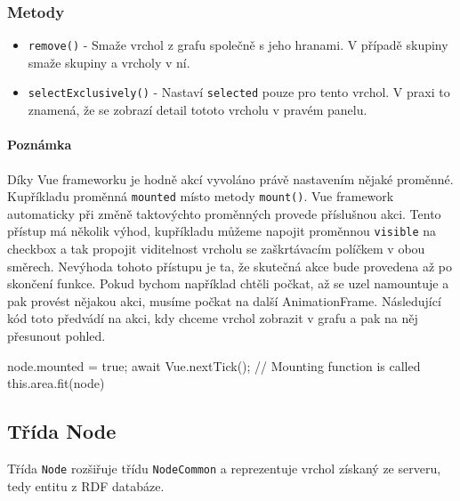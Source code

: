 \subsubsection*{Metody}
\begin{itemize}
  \item \texttt{remove()} - Smaže vrchol z grafu společně s jeho hranami. V případě skupiny smaže skupiny a vrcholy v ní.
  \item \texttt{selectExclusively()} - Nastaví \texttt{selected} pouze pro tento vrchol. V praxi to znamená, že se zobrazí detail tototo vrcholu v pravém panelu.
\end{itemize}

\paragraph{Poznámka} Díky Vue frameworku je hodně akcí vyvoláno právě nastavením nějaké proměnné. Kupříkladu proměnná \texttt{mounted} místo metody \texttt{mount()}. Vue framework automaticky při změně taktovýchto proměnných provede příslušnou akci. Tento přístup má několik výhod, kupříkladu můžeme napojit proměnnou \texttt{visible} na checkbox a tak propojit viditelnost vrcholu se zaškrtávacím políčkem v obou směrech. Nevýhoda tohoto přístupu je ta, že skutečná akce bude provedena až po skončení funkce. Pokud bychom například chtěli počkat, až se uzel namountuje a pak provést nějakou akci, musíme počkat na další AnimationFrame. Následující kód toto předvádí na akci, kdy chceme vrchol zobrazit v grafu a pak na něj přesunout pohled.

\begin{code}
node.mounted = true;
await Vue.nextTick(); // Mounting function is called
this.area.fit(node)
\end{code}

\subsection{Třída Node}
Třída \texttt{Node} rozšiřuje třídu \texttt{NodeCommon} a reprezentuje vrchol získaný ze serveru, tedy entitu z RDF databáze.

